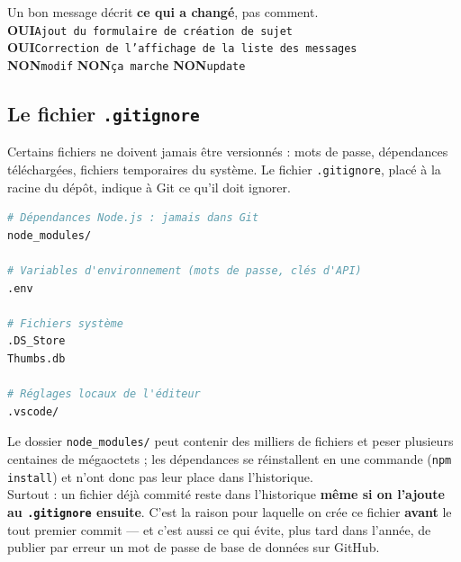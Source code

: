 \documentclass[a4paper,11pt]{article}
\begin{document}
\begin{tcolorbox}[astuce, title={Bonne pratique --- Messages de commit}]
Un bon message décrit \textbf{ce qui a changé}, pas comment.\\[4pt]
\textcolor{successGreen}{\textbf{OUI}}\quad \texttt{Ajout du formulaire de création de sujet}\\
\textcolor{successGreen}{\textbf{OUI}}\quad \texttt{Correction de l'affichage de la liste des messages}\\[3pt]
\textcolor{alertRed}{\textbf{NON}}\quad \texttt{modif} \qquad
\textcolor{alertRed}{\textbf{NON}}\quad \texttt{ça marche} \qquad
\textcolor{alertRed}{\textbf{NON}}\quad \texttt{update}
\end{tcolorbox}

\subsection{Le fichier \texttt{.gitignore}}

Certains fichiers ne doivent jamais être versionnés : mots de passe, dépendances téléchargées, fichiers temporaires du système. Le fichier \texttt{.gitignore}, placé à la racine du dépôt, indique à Git ce qu'il doit ignorer.

\begin{lstlisting}[language=bash, caption={\texttt{.gitignore} --- version à créer dès la semaine 1}]
# Dépendances Node.js : jamais dans Git
node_modules/

# Variables d'environnement (mots de passe, clés d'API)
.env

# Fichiers système
.DS_Store
Thumbs.db

# Réglages locaux de l'éditeur
.vscode/
\end{lstlisting}

\begin{tcolorbox}[attention, title={Important --- Le \texttt{.gitignore} vient avant le premier commit}]
Le dossier \texttt{node\_modules/} peut contenir des milliers de fichiers et peser plusieurs centaines de mégaoctets ; les dépendances se réinstallent en une commande (\texttt{npm install}) et n'ont donc pas leur place dans l'historique.\\[4pt]
Surtout : un fichier déjà commité reste dans l'historique \textbf{même si on l'ajoute au \texttt{.gitignore} ensuite}. C'est la raison pour laquelle on crée ce fichier \textbf{avant} le tout premier commit --- et c'est aussi ce qui évite, plus tard dans l'année, de publier par erreur un mot de passe de base de données sur GitHub.
\end{tcolorbox}
\end{document}
